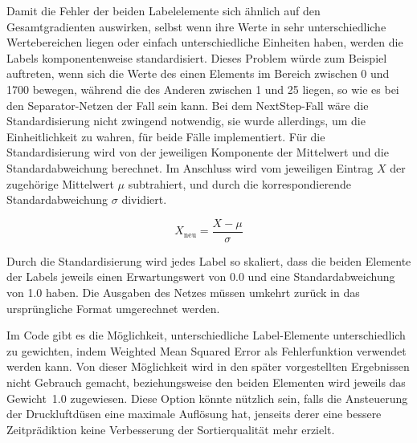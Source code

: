 Damit die Fehler der beiden Labelelemente sich ähnlich auf den Gesamtgradienten auswirken,
selbst wenn ihre Werte in sehr unterschiedliche Wertebereichen liegen oder einfach unterschiedliche Einheiten haben, werden die Labels komponentenweise standardisiert.
Dieses Problem würde zum Beispiel auftreten, wenn sich die Werte des einen Elements im Bereich zwischen 0 und 1700 bewegen, während die des Anderen zwischen 1 und 25 liegen,
so wie es bei den Separator-Netzen der Fall sein kann.
Bei dem NextStep-Fall wäre die Standardisierung nicht zwingend notwendig, 
sie wurde allerdings, um die Einheitlichkeit zu wahren, für beide Fälle implementiert. 
Für die Standardisierung wird von der jeweiligen Komponente der Mittelwert und die Standardabweichung berechnet. 
Im Anschluss wird vom jeweiligen Eintrag \(X\) der zugehörige Mittelwert \(\mu\) subtrahiert, und durch die korrespondierende Standardabweichung \(\sigma\) dividiert.
	
\begin{equation*}
	X_{\text{neu}} = \frac{X - \mu}{\sigma} %
\end{equation*}

Durch die Standardisierung wird jedes Label so skaliert, dass die beiden Elemente der Labels jeweils einen Erwartungswert von 0.0 und eine Standardabweichung von 1.0 haben.
Die Ausgaben des Netzes müssen umkehrt zurück in das ursprüngliche Format umgerechnet werden.

Im Code gibt es die Möglichkeit, unterschiedliche Label-Elemente unterschiedlich zu gewichten, indem Weighted Mean Squared Error als Fehlerfunktion verwendet werden kann. 
Von dieser Möglichkeit wird in den später vorgestellten Ergebnissen nicht Gebrauch gemacht, beziehungsweise den beiden Elementen wird jeweils das Gewicht~1.0 zugewiesen.
Diese Option könnte nützlich sein, falls die Ansteuerung der Druckluftdüsen eine maximale Auflösung hat, jenseits derer eine bessere Zeitprädiktion keine Verbesserung der Sortierqualität mehr erzielt.






